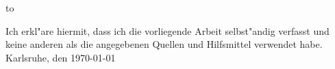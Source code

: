 \begin{otherlanguage}{ngerman}  
\thispagestyle{empty}
\vspace*{35\baselineskip}
\hbox to \textwidth{\hrulefill}
\par
\noindent Ich erkl"are hiermit, dass ich die vorliegende Arbeit selbst"andig verfasst und
keine anderen als die angegebenen Quellen und Hilfsmittel verwendet habe. \\

\noindent Karlsruhe, den \today
\end{otherlanguage}

\clearpage






